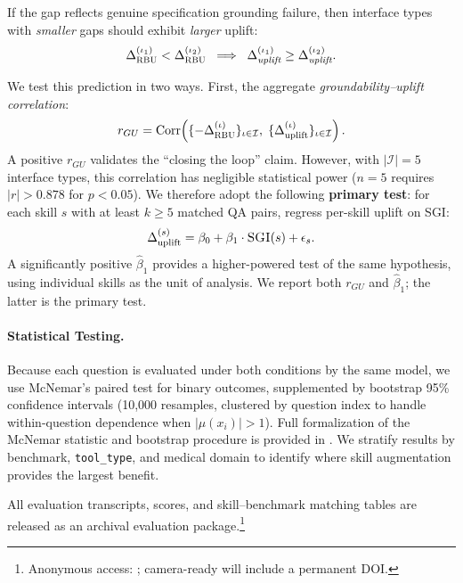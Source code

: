 \begin{proposition}
\label{prop:groundability}
If the \rbu gap reflects genuine specification grounding failure, then interface types with \emph{smaller} \rbu gaps should exhibit \emph{larger} uplift:
\begin{equation}
    \Delta_{\textsc{RBU}}^{(\iota_1)} < \Delta_{\textsc{RBU}}^{(\iota_2)} \;\implies\; \Delta_{\emph{uplift}}^{(\iota_1)} \geq \Delta_{\emph{uplift}}^{(\iota_2)}.
    \label{eq:uplift_prediction}
\end{equation}
\end{proposition}
\noindent We test this prediction in two ways.
First, the aggregate \emph{groundability--uplift correlation}:
\[
    r_{GU} = \text{Corr}\!\left(\{-\Delta_{\textsc{RBU}}^{(\iota)}\}_{\iota \in \mathcal{I}},\; \{\Delta_{\text{uplift}}^{(\iota)}\}_{\iota \in \mathcal{I}}\right).
\]
A positive $r_{GU}$ validates the ``closing the loop'' claim.
However, with $|\mathcal{I}| = 5$ interface types, this correlation has negligible statistical power ($n = 5$ requires $|r| > 0.878$ for $p < 0.05$).
We therefore adopt the following \textbf{primary test}: for each skill $s$ with at least $k \geq 5$ matched QA pairs, regress per-skill uplift on \textsc{SGI}:
\begin{equation}
    \Delta_{\text{uplift}}^{(s)} = \beta_0 + \beta_1 \cdot \textsc{SGI}(s) + \epsilon_s.
    \label{eq:per_skill_reg}
\end{equation}
A significantly positive $\hat{\beta}_1$ provides a higher-powered test of the same hypothesis, using individual skills as the unit of analysis.
We report both $r_{GU}$ and $\hat{\beta}_1$; the latter is the primary test.

\paragraph{Statistical Testing.}
Because each question is evaluated under both conditions by the same model, we use McNemar's paired test for binary outcomes, supplemented by bootstrap 95\% confidence intervals (10,000 resamples, clustered by question index to handle within-question dependence when $|\mu(x_i)| > 1$).
Full formalization of the McNemar statistic and bootstrap procedure is provided in .
We stratify results by benchmark, \texttt{tool\_type}, and medical domain to identify where skill augmentation provides the largest benefit.


All evaluation transcripts, scores, and skill--benchmark matching tables are released as an archival evaluation package.\footnote{Anonymous access: \anonrepo; camera-ready will include a permanent DOI.}
